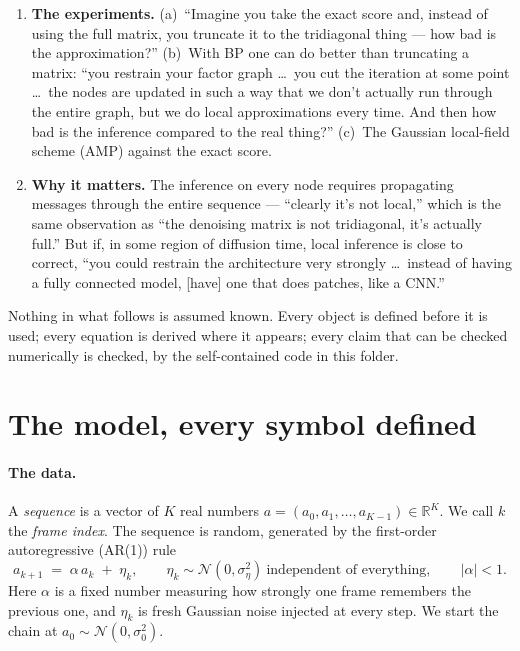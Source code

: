\documentclass[11pt]{article}
\theoremstyle{definition}
\theoremstyle{remark}
\newcommand{\R}{\mathbb{R}}
\newcommand{\N}{\mathcal{N}}
\begin{document}
\begin{enumerate}[leftmargin=1.7em, itemsep=2pt]
something times $a_k$ plus a Gaussian. You knew how to solve it, you solved
it. Can we actually do this with a message-passing algorithm? \dots\ the
actual Gaussianity assumption on the BP messages, in the Gaussian data case
\dots\ and see if we recover what we had.''
\item \textbf{The experiments.} (a)~``Imagine you take the exact score and,
instead of using the full matrix, you truncate it to the tridiagonal thing
--- how bad is the approximation?'' (b)~With BP one can do better than
truncating a matrix: ``you restrain your factor graph \dots\ you cut the
iteration at some point \dots\ the nodes are updated in such a way that we
don't actually run through the entire graph, but we do local approximations
every time. And then how bad is the inference compared to the real thing?''
(c)~The Gaussian local-field scheme (AMP) against the exact score.
\item \textbf{Why it matters.} The inference on every node requires
propagating messages through the entire sequence --- ``clearly it's not
local,'' which is the same observation as ``the denoising matrix is not
tridiagonal, it's actually full.'' But if, in some region of diffusion time,
local inference is close to correct, ``you could restrain the architecture
very strongly \dots\ instead of having a fully connected model, [have] one
that does patches, like a CNN.''
\end{enumerate}

\noindent Nothing in what follows is assumed known. Every object is defined
before it is used; every equation is derived where it appears; every claim
that can be checked numerically is checked, by the self-contained code in
this folder.

\section{The model, every symbol defined}\label{sec:model}

\paragraph{The data.} A \emph{sequence} is a vector of $K$ real numbers
$a=(a_0,a_1,\dots,a_{K-1})\in\R^K$. We call $k$ the \emph{frame index}. The
sequence is random, generated by the first-order autoregressive (AR(1)) rule
\begin{equation}\label{eq:ar1}
  a_{k+1}\;=\;\alpha\,a_k\;+\;\eta_k,
  \qquad \eta_k\sim\N(0,\sigma_\eta^2)\ \text{independent of everything},
  \qquad |\alpha|<1 .
\end{equation}
Here $\alpha$ is a fixed number measuring how strongly one frame remembers
the previous one, and $\eta_k$ is fresh Gaussian noise injected at every
step. We start the chain at $a_0\sim\N(0,\sigma_0^2)$.
\end{document}
